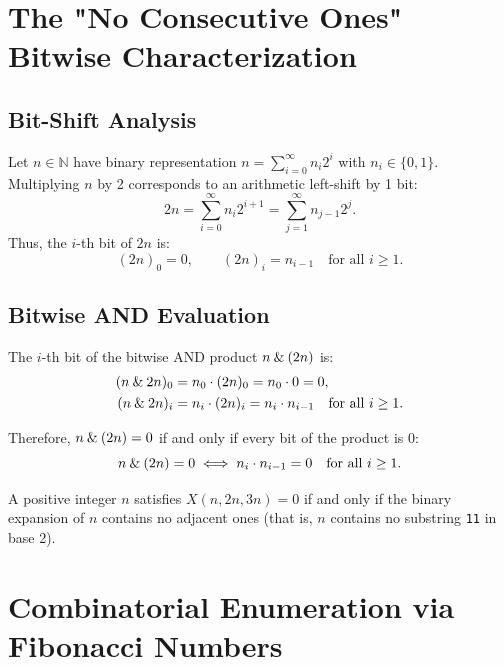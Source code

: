 ﻿\documentclass[a4paper]{article}
\begin{document}
\section{The "No Consecutive Ones" Bitwise Characterization}

\subsection{Bit-Shift Analysis}
Let $n \in \mathbb{N}$ have binary representation $n = \sum_{i=0}^\infty n_i 2^i$ with $n_i \in \{0, 1\}$.
Multiplying $n$ by 2 corresponds to an arithmetic left-shift by 1 bit:
\begin{equation}
2n = \sum_{i=0}^\infty n_i 2^{i+1} = \sum_{j=1}^\infty n_{j-1} 2^j.
\end{equation}
Thus, the $i$-th bit of $2n$ is:
\begin{equation}
(2n)_0 = 0, \qquad (2n)_i = n_{i-1} \quad \text{for all } i \ge 1.
\end{equation}

\subsection{Bitwise AND Evaluation}
The $i$-th bit of the bitwise AND product $n \mathbin{\&} (2n)$ is:
\begin{align}
(n \mathbin{\&} 2n)_0 &= n_0 \cdot (2n)_0 = n_0 \cdot 0 = 0, \\
(n \mathbin{\&} 2n)_i &= n_i \cdot (2n)_i = n_i \cdot n_{i-1} \quad \text{for all } i \ge 1.
\end{align}

Therefore, $n \mathbin{\&} (2n) = 0$ if and only if every bit of the product is 0:
\begin{equation}
n \mathbin{\&} (2n) = 0 \iff n_i \cdot n_{i-1} = 0 \quad \text{for all } i \ge 1.
\end{equation}

\begin{theorem}\label{thm:nim:no_consecutive_ones}
A positive integer $n$ satisfies $X(n, 2n, 3n) = 0$ if and only if the binary expansion of $n$ contains no adjacent ones (that is, $n$ contains no substring \texttt{11} in base 2).
\end{theorem}

\section{Combinatorial Enumeration via Fibonacci Numbers}
\end{document}
